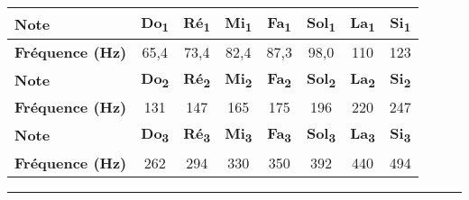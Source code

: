 \documentclass[12pt,a4paper]{article}
\begin{document}
\begin{center}
\begin{tabular}{l|c|c|c|c|c|c|c}
\textbf{Note}						& \textbf{Do\textsubscript{1}} & \textbf{Ré\textsubscript{1}} & \textbf{Mi\textsubscript{1}} & \textbf{Fa\textsubscript{1}} & \textbf{Sol\textsubscript{1}} & \textbf{La\textsubscript{1}} & \textbf{Si\textsubscript{1}} \\
\hline
\textbf{Fréquence (Hz)} 	& 65{,}4 & 73{,}4 & 82{,}4 & 87{,}3 & 98{,}0 & 110 & 123 \\
\hline \hline
\textbf{Note}						& \textbf{Do\textsubscript{2}} & \textbf{Ré\textsubscript{2}} & \textbf{Mi\textsubscript{2}} & \textbf{Fa\textsubscript{2}} & \textbf{Sol\textsubscript{2}} & \textbf{La\textsubscript{2}} & \textbf{Si\textsubscript{2}} \\
\hline
\textbf{Fréquence (Hz)} 	& 131 & 147 & 165 & 175 & 196 & 220 & 247 \\
\hline \hline
\textbf{Note}						& \textbf{Do\textsubscript{3}} & \textbf{Ré\textsubscript{3}} & \textbf{Mi\textsubscript{3}} & \textbf{Fa\textsubscript{3}} & \textbf{Sol\textsubscript{3}} & \textbf{La\textsubscript{3}} & \textbf{Si\textsubscript{3}} \\
\hline
\textbf{Fréquence (Hz)} 	& 262 & 294 & 330 & 350 & 392 & 440 & 494
\end{tabular}
\end{center}

\vspace{5pt}
\hrule{}
\vspace{5pt}
\end{document}
